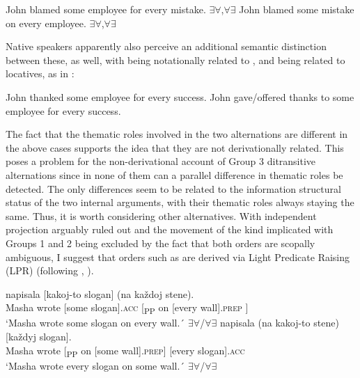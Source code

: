 \documentclass[output=paper,colorlinks,citecolor=brown,nonflat]{./langscibook}
\begin{document}
\ea%
    \label{ex:antonyuk:57}
    \ea \label{ex:antonyuk:57a}
    John blamed some employee for every mistake. \hfill ${\exists}{\forall}$,${\forall}{\exists}$
    \ex \label{ex:antonyuk:57b}
    John blamed some mistake on every employee. \hfill ${\exists}{\forall}$,${\forall}{\exists}$
    \z
\z

Native speakers apparently also perceive an additional semantic distinction between these, as well, with  being notationally related to , and  being related to locatives, as in :


\ea%
    \label{ex:antonyuk:58}
    \ea \label{ex:antonyuk:58a}
    John thanked some employee for every success.
    \ex \label{ex:antonyuk:58b}
    John gave/offered thanks to some employee for every success.
    \z
\z

The fact that the thematic roles involved in the two alternations are different in the above cases supports the idea that they are not derivationally related. This poses a problem for the non-derivational account of Group 3 ditransitive alternations since in none of them can a parallel difference in thematic roles be detected. The only differences seem to be related to the information structural status of the two internal arguments, with their thematic roles always staying the same. Thus, it is worth considering other alternatives. With independent projection arguably ruled out and the movement of the kind implicated with Groups 1 and 2 being excluded by the fact that both orders are scopally ambiguous, I suggest that orders such as  are derived via Light Predicate Raising (LPR) (following \citealt{Larson1989}, \citeyear{Larson2014}).


\ea%
    \label{ex:antonyuk:59}
    \ea \label{ex:antonyuk:59a}
      {napisala} {[kakoj-to} {slogan]}   {}    {(na} {každoj} {stene)}.\\
    Masha wrote    [some     slogan].\textsc{acc} [\textsubscript{PP} on [every wall].\textsc{prep} ]\\
    \glt `Masha wrote some slogan on every wall.´ \hfill ${\exists}{\forall}$/${\forall}{\exists}$
    \ex \label{ex:antonyuk:59b}
     {napisala} {} {(na}  {kakoj-to} {stene)}        {[každyj} {slogan]}.\\
    Masha wrote [\textsubscript{PP} on [some     wall].\textsc{prep}] [every slogan].\textsc{acc}\\
    \glt `Masha wrote every slogan on some wall.´ \hfill ${\exists}{\forall}$/${\forall}{\exists}$
    \z
\z
\end{document}
